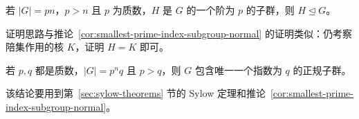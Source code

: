 \begin{proposition}\label{prop:prime-order-subgroup-small-cofactor-normal}
若 $|G|=pn$，$p>n$ 且 $p$ 为质数，$H$ 是 $G$ 的一个阶为 $p$ 的子群，则 $H\trianglelefteq G$。
\end{proposition}

\begin{purplenote}
证明思路与推论~\ref{cor:smallest-prime-index-subgroup-normal} 的证明类似：仍考察陪集作用的核 $K$，证明 $H=K$ 即可。
\end{purplenote}

\begin{proposition}\label{prop:unique-normal-subgroup-prime-power-index}
若 $p,q$ 都是质数，$|G|=p^nq$ 且 $p>q$，则 $G$ 包含唯一一个指数为 $q$ 的正规子群。
\end{proposition}

\begin{purplenote}
该结论要用到第~\ref{sec:sylow-theorems} 节的 Sylow 定理和推论~\ref{cor:smallest-prime-index-subgroup-normal}。
\end{purplenote}
